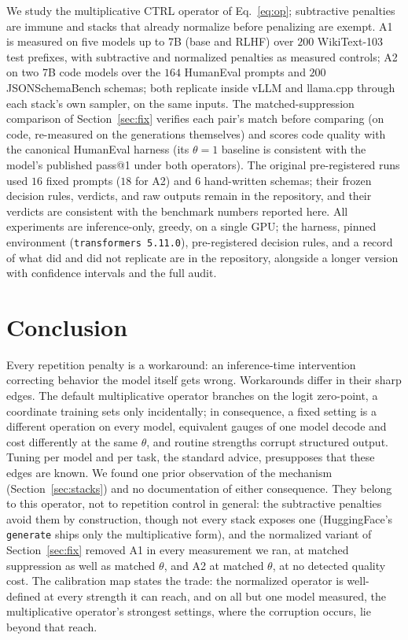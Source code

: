 \documentclass[11pt]{article}
\makeatletter
\newcommand{\thp}{\theta}
\newcommand{\code}[1]{\texttt{#1}}
\newcommand{\passk}[1]{pass@#1}
\makeatother
\begin{document}
We study the multiplicative CTRL operator of Eq.~\eqref{eq:op}; subtractive penalties are immune and
stacks that already normalize before penalizing are exempt. A1 is measured on five models up to 7B
(base and RLHF) over $200$ WikiText-103 test prefixes, with subtractive and normalized penalties
as measured controls; A2 on two 7B code models over the $164$
HumanEval prompts and $200$ JSONSchemaBench schemas; both replicate inside vLLM and llama.cpp
through each
stack's own sampler, on the same inputs. The matched-suppression comparison of
Section~\ref{sec:fix} verifies each pair's match before comparing (on code, re-measured on the
generations themselves) and scores code quality with the canonical HumanEval harness (its
$\thp=1$ baseline is consistent with the model's published \passk{1} under both operators). The original pre-registered
runs used $16$ fixed prompts ($18$ for A2)
and $6$ hand-written schemas; their frozen decision rules, verdicts, and raw outputs remain in the
repository, and their verdicts are consistent with the benchmark numbers reported here. All
experiments are inference-only, greedy, on a single
GPU; the harness, pinned environment (\code{transformers 5.11.0}), pre-registered decision rules, and
a record of what did and did not replicate are in the repository, alongside a longer version
with confidence intervals and the full audit.

\section{Conclusion}

Every repetition penalty is a workaround: an inference-time intervention correcting behavior the
model itself gets wrong. Workarounds differ in their sharp edges. The default multiplicative
operator branches on the logit zero-point, a coordinate training sets only incidentally; in
consequence, a fixed setting is a different operation on every model, equivalent gauges of one
model decode and cost differently at the same $\thp$, and routine strengths corrupt structured
output. Tuning per model and per task, the standard advice, presupposes that these edges are
known. We found one prior observation of the mechanism (Section~\ref{sec:stacks}) and no
documentation of either consequence. They belong to this
operator, not to repetition control in general: the subtractive penalties avoid them by
construction, though not every stack exposes one (HuggingFace's \code{generate} ships only the
multiplicative form), and the normalized variant of Section~\ref{sec:fix} removed A1 in every
measurement we ran, at matched suppression as well as matched $\thp$, and A2 at matched $\thp$, at
no detected quality cost. The calibration map states the trade: the normalized
operator is well-defined at every strength it can reach, and on all but one model measured, the
multiplicative operator's strongest settings, where the corruption occurs, lie beyond that
reach.



\end{document}
